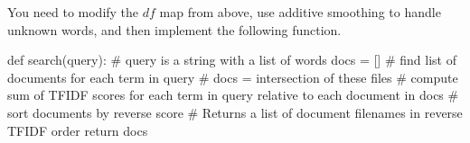\begin{fullwidth}
You need to modify the $df$ map from above, use additive smoothing to handle unknown words, and then implement the following function.

\begin{pyverbatim}
def search(query): # query is a string with a list of words
    docs = []
    # find list of documents for each term in query
    # docs = intersection of these files
    # compute sum of TFIDF scores for each term in query relative to each document in docs
    # sort documents by reverse score
    # Returns a list of document filenames in reverse TFIDF order
    return docs
\end{pyverbatim}

\end{fullwidth}


